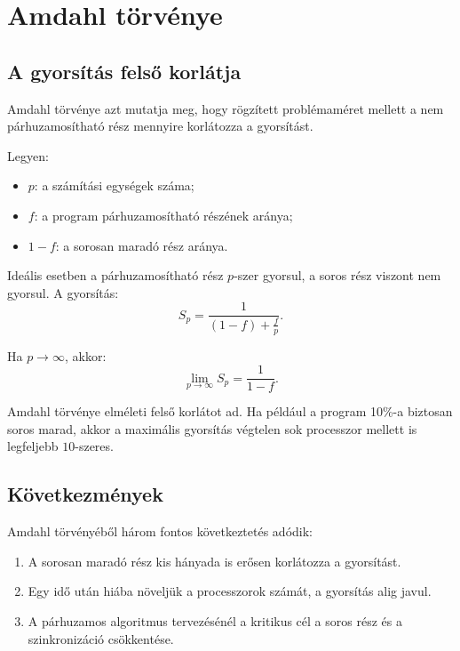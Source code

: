 \section{Amdahl törvénye}

\subsection{A gyorsítás felső korlátja}

Amdahl törvénye azt mutatja meg, hogy rögzített problémaméret mellett a nem párhuzamosítható rész mennyire korlátozza a gyorsítást.

Legyen:

\begin{itemize}
  \item $p$: a számítási egységek száma;
  \item $f$: a program párhuzamosítható részének aránya;
  \item $1-f$: a sorosan maradó rész aránya.
\end{itemize}

Ideális esetben a párhuzamosítható rész $p$-szer gyorsul, a soros rész viszont nem gyorsul. A gyorsítás:
\[
  S_p=\frac{1}{(1-f)+\frac{f}{p}}.
\]

Ha $p\to\infty$, akkor:
\[
  \lim_{p\to\infty} S_p=\frac{1}{1-f}.
\]



\begin{warningbox}
Amdahl törvénye elméleti felső korlátot ad. Ha például a program 10\%-a biztosan soros marad, akkor a maximális gyorsítás végtelen sok processzor mellett is legfeljebb $10$-szeres.
\end{warningbox}

\subsection{Következmények}

Amdahl törvényéből három fontos következtetés adódik:

\begin{enumerate}
  \item A sorosan maradó rész kis hányada is erősen korlátozza a gyorsítást.
  \item Egy idő után hiába növeljük a processzorok számát, a gyorsítás alig javul.
  \item A párhuzamos algoritmus tervezésénél a kritikus cél a soros rész és a szinkronizáció csökkentése.
\end{enumerate}

